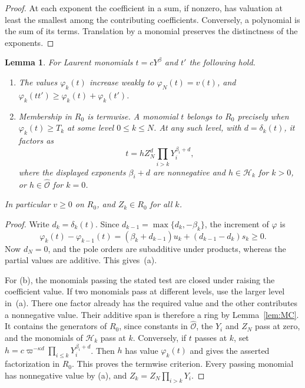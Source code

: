 \documentclass[11pt, letterpaper]{article}
\newtheorem{lemma}[theorem]{Lemma}
\theoremstyle{definition}
\theoremstyle{remark}
\begin{document}
\begin{proof}
    At each exponent the coefficient in a sum, if nonzero, has valuation at least the smallest among the contributing coefficients.
    Conversely, a polynomial is the sum of its terms.
    Translation by a monomial preserves the distinctness of the exponents.
\end{proof}

\begin{lemma}
    \label{lem:G1}
    For Laurent monomials $t = cY^{\beta}$ and $t'$ the following hold.
    \begin{enumerate}
        \item[\textup{(a)}] The values $\varphi_{k}(t)$ increase weakly to $\varphi_{N}(t) = v(t)$, and $\varphi_{k}(tt') \ge \varphi_{k}(t) + \varphi_{k}(t')$.
        \item[\textup{(b)}] Membership in $R_{0}$ is termwise.
        A monomial $t$ belongs to $R_{0}$ precisely when $\varphi_{k}(t) \ge T_{k}$ at some level $0 \le k \le N$.
        At any such level, with $d = \delta_{k}(t)$, it factors as
        \[
            t = h Z_{N}^{d}\prod_{i > k}Y_{i}^{\beta_{i} + d},
        \]
        where the displayed exponents $\beta_{i} + d$ are nonnegative and $h \in \mathcal{H}_{k}$ for $k > 0$, or $h \in \widehat{\mathcal{O}}$ for $k = 0$.
    \end{enumerate}
    In particular $v \ge 0$ on $R_{0}$, and $Z_{k} \in R_{0}$ for all $k$.
\end{lemma}

\begin{proof}
    Write $d_{k} = \delta_{k}(t)$.
    Since $d_{k - 1} = \max\{d_{k}, -\beta_{k}\}$, the increment of $\varphi$ is
    \[
        \varphi_{k}(t) - \varphi_{k - 1}(t)
        = (\beta_{k} + d_{k - 1})u_{k} + (d_{k - 1} - d_{k})s_{k} \ge 0.
    \]
    Now $d_{N} = 0$, and the pole orders are subadditive under products, whereas the partial values are additive.
    This gives~(a).

    For (b), the monomials passing the stated test are closed under raising the coefficient value.
    If two monomials pass at different levels, use the larger level in~(a).
    There one factor already has the required value and the other contributes a nonnegative value.
    Their additive span is therefore a ring by Lemma~\ref{lem:MC}.
    It contains the generators of $R_{0}$, since constants in $\widehat{\mathcal{O}}$, the $Y_{i}$ and $Z_{N}$ pass at zero, and the monomials of $\mathcal{H}_{k}$ pass at $k$.
    Conversely, if $t$ passes at $k$, set $h = c\varpi^{-\kappa d}\prod_{i \le k}Y_{i}^{\beta_{i} + d}$.
    Then $h$ has value $\varphi_{k}(t)$ and gives the asserted factorization in $R_{0}$.
    This proves the termwise criterion.
    Every passing monomial has nonnegative value by (a), and $Z_{k} = Z_{N}\prod_{i > k}Y_{i}$.
\end{proof}
\end{document}
